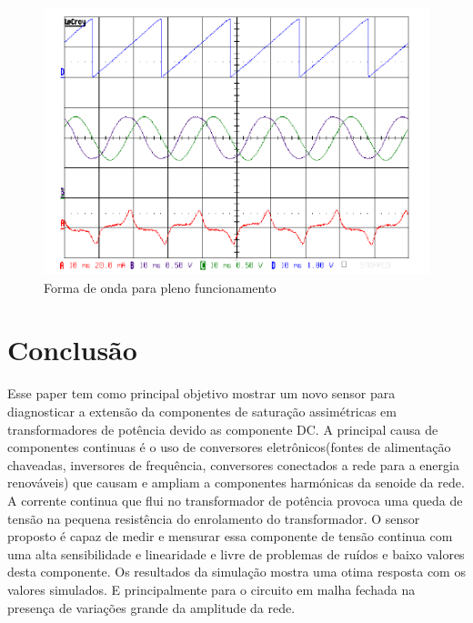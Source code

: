 \documentclass[paper=a4, fontsize=11pt]{article}
\begin{document}
\begin{figure}[!ht]
	\centering
	\includegraphics[scale=.8]{fig16.png}
    \caption{Forma de onda para pleno funcionamento}
    \label{fig:figura16}
\end{figure}

\section{Conclusão}

Esse paper tem como principal objetivo mostrar um novo sensor para diagnosticar a 
extensão da componentes de saturação assimétricas em transformadores de potência
devido as componente DC. A principal causa de componentes continuas é o uso
de conversores eletrônicos(fontes de alimentação chaveadas, inversores de frequência,
conversores conectados a rede para a energia renováveis) que causam e ampliam
a componentes harmónicas da senoide da rede. A corrente continua que flui no 
transformador de potência provoca uma queda de tensão na pequena resistência do
enrolamento do transformador. O sensor proposto é capaz de medir e mensurar essa
componente de tensão continua com uma alta sensibilidade e linearidade e livre de
problemas de ruídos e baixo valores desta componente. Os resultados da simulação
mostra uma otima resposta com os valores simulados. E principalmente para o circuito
em malha fechada na presença de variações grande da amplitude da rede.
\end{document}
